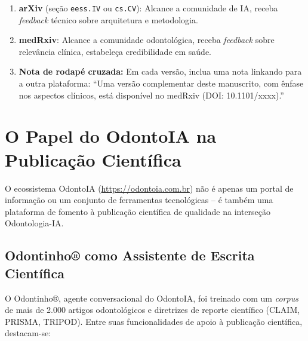\begin{enumerate}
  \item \textbf{arXiv} (seção \texttt{eess.IV} ou \texttt{cs.CV}): Alcance a
    comunidade de IA, receba \textit{feedback} técnico sobre arquitetura e
    metodologia.
  \item \textbf{medRxiv}: Alcance a comunidade odontológica, receba
    \textit{feedback} sobre relevância clínica, estabeleça credibilidade em
    saúde.
  \item \textbf{Nota de rodapé cruzada:} Em cada versão, inclua uma nota
    linkando para a outra plataforma: ``Uma versão complementar deste manuscrito,
    com ênfase nos aspectos clínicos, está disponível no medRxiv (DOI:
    10.1101/xxxx).''
\end{enumerate}


\section{O Papel do OdontoIA na Publicação Científica}
\label{sec:odontoia-publicacao}

\nivelquatro

O ecossistema OdontoIA (\url{https://odontoia.com.br}) não é apenas um portal de
informação ou um conjunto de ferramentas tecnológicas -- é também uma plataforma
de fomento à publicação científica de qualidade na interseção Odontologia-IA.

\subsection{Odontinho® como Assistente de Escrita Científica}

O Odontinho®, agente conversacional do OdontoIA, foi treinado com um \textit{
corpus} de mais de 2.000 artigos odontológicos e diretrizes de reporte
científico (CLAIM, PRISMA, TRIPOD). Entre suas funcionalidades de apoio à
publicação científica, destacam-se:

